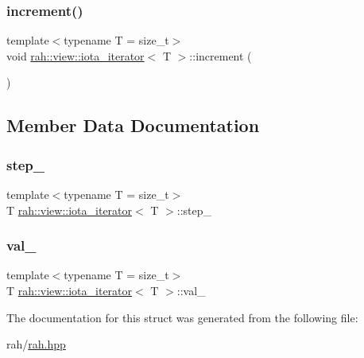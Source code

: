 \mbox{\label{structrah_1_1view_1_1iota__iterator_a52be6587654c9783137bf31d800f315d}} 
\subsubsection{\texorpdfstring{increment()}{increment()}}
{\footnotesize\ttfamily template$<$typename T  = size\+\_\+t$>$ \\
void \mbox{\hyperlink{structrah_1_1view_1_1iota__iterator}{rah\+::view\+::iota\+\_\+iterator}}$<$ T $>$\+::increment (\begin{DoxyParamCaption}{ }\end{DoxyParamCaption})\hspace{0.3cm}{\ttfamily [inline]}}



\subsection{Member Data Documentation}
\mbox{\label{structrah_1_1view_1_1iota__iterator_ac30abc689d8d82810bf78ceec3893bd2}} 
\subsubsection{\texorpdfstring{step\_}{step\_}}
{\footnotesize\ttfamily template$<$typename T  = size\+\_\+t$>$ \\
T \mbox{\hyperlink{structrah_1_1view_1_1iota__iterator}{rah\+::view\+::iota\+\_\+iterator}}$<$ T $>$\+::step\+\_\+}

\mbox{\label{structrah_1_1view_1_1iota__iterator_a7a2ef77dc1a09b2eea42804c2297d057}} 
\subsubsection{\texorpdfstring{val\_}{val\_}}
{\footnotesize\ttfamily template$<$typename T  = size\+\_\+t$>$ \\
T \mbox{\hyperlink{structrah_1_1view_1_1iota__iterator}{rah\+::view\+::iota\+\_\+iterator}}$<$ T $>$\+::val\+\_\+}



The documentation for this struct was generated from the following file\+:\begin{DoxyCompactItemize}
\item 
rah/\mbox{\hyperlink{rah_8hpp}{rah.\+hpp}}\end{DoxyCompactItemize}
